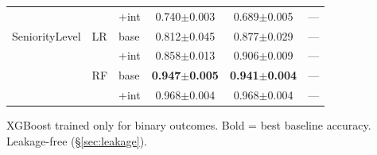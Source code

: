 \documentclass[conference]{IEEEtran}
\begin{document}
\begin{table}[htb]
{\begin{tabular}{lllccc}
& & +int & 0.740$\pm$0.003 & 0.689$\pm$0.005 & --- \\
SeniorityLevel & LR & base & 0.812$\pm$0.045 & 0.877$\pm$0.029 & --- \\
& & +int & 0.858$\pm$0.013 & 0.906$\pm$0.009 & --- \\
& RF & base & \textbf{0.947$\pm$0.005} & \textbf{0.941$\pm$0.004} & --- \\
& & +int & 0.968$\pm$0.004 & 0.968$\pm$0.004 & --- \\
\hline
\end{tabular}
}
\par\vspace{2pt}
\small{XGBoost trained only for binary outcomes. Bold = best baseline accuracy. Leakage-free (\S\ref{sec:leakage}).}
\end{table}
\end{document}
